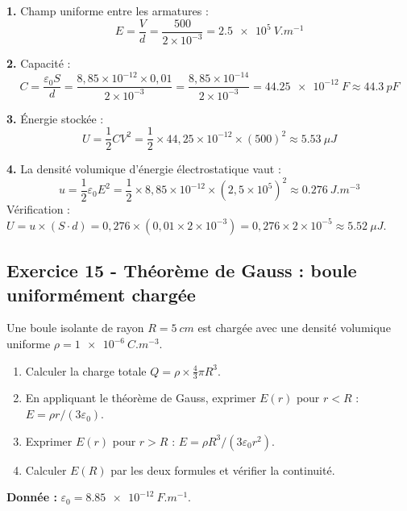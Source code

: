 \documentclass[12pt,a4paper]{article}
\begin{document}
\begin{boitecorrige}
\textbf{1.} Champ uniforme entre les armatures :
\[
E = \frac{V}{d} = \frac{500}{2\times10^{-3}} = \qty{2.5e5}{V.m^{-1}}
\]

\textbf{2.} Capacité :
\[
C = \frac{\varepsilon_0 S}{d} = \frac{8{,}85\times10^{-12}\times0{,}01}{2\times10^{-3}} = \frac{8{,}85\times10^{-14}}{2\times10^{-3}} = \qty{44.25e-12}{F} \approx \qty{44.3}{pF}
\]

\textbf{3.} Énergie stockée :
\[
U = \frac{1}{2}CV^2 = \frac{1}{2}\times44{,}25\times10^{-12}\times(500)^2
\approx \qty{5.53}{\mu J}
\]

\textbf{4.} La densité volumique d'énergie électrostatique vaut :
\[
u = \frac{1}{2}\varepsilon_0 E^2 = \frac{1}{2}\times8{,}85\times10^{-12}\times(2{,}5\times10^5)^2
\approx \qty{0.276}{J.m^{-3}}
\]
Vérification : $U = u\times(S\cdot d) = 0{,}276\times(0{,}01\times2\times10^{-3}) = 0{,}276\times2\times10^{-5} \approx \qty{5.52}{\mu J}$.
\end{boitecorrige}

\subsection*{Exercice 15 - Théorème de Gauss : boule uniformément chargée \niveau{\moyen}}

\begin{boiteexercice}
Une boule isolante de rayon $R = \qty{5}{cm}$ est chargée avec une densité volumique uniforme $\rho = \qty{1e-6}{C.m^{-3}}$.
\begin{enumerate}
  \item Calculer la charge totale $Q = \rho\times\frac{4}{3}\pi R^3$.
  \item En appliquant le théorème de Gauss, exprimer $E(r)$ pour $r < R$ : $E = \rho r/(3\varepsilon_0)$.
  \item Exprimer $E(r)$ pour $r > R$ : $E = \rho R^3/(3\varepsilon_0 r^2)$.
  \item Calculer $E(R)$ par les deux formules et vérifier la continuité.
\end{enumerate}
\textbf{Donnée :} $\varepsilon_0 = \qty{8.85e-12}{F.m^{-1}}$.
\end{boiteexercice}
\end{document}
